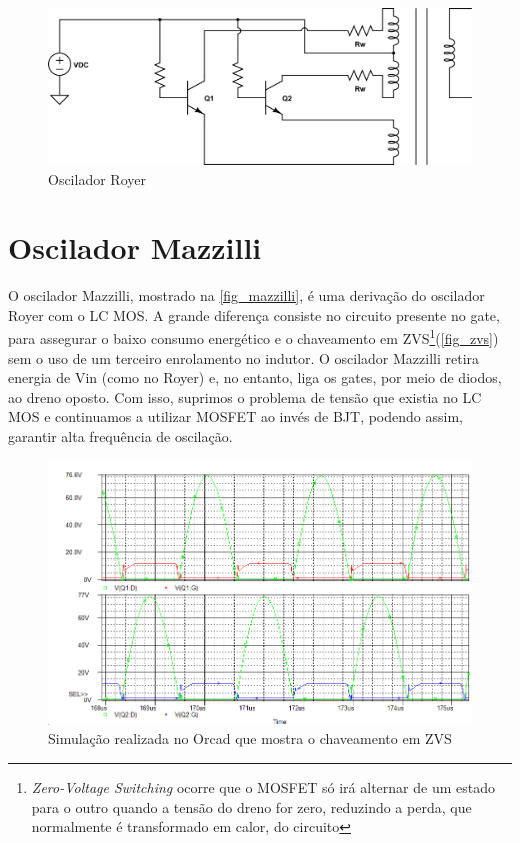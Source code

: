 \begin{figure}[htb]
\caption{\label{fig_royer}Oscilador Royer}
\begin{center}
\includegraphics[scale=0.5]{images/royer-oscillator.png}
\end{center}
\end{figure}

\section{Oscilador Mazzilli}
O oscilador Mazzilli\cite{paolucci2009novel}\cite{mcclusky2010high}, mostrado na \autoref{fig_mazzilli}, é uma derivação do oscilador Royer com o LC MOS. A grande diferença consiste no circuito presente no gate, para assegurar o baixo consumo energético e o chaveamento em ZVS\footnote{\emph{Zero-Voltage Switching} ocorre que o MOSFET só irá alternar de um estado para o outro quando a tensão do dreno for zero, reduzindo a perda, que normalmente é transformado em calor, do circuito}(\autoref{fig_zvs}) sem o uso de um terceiro enrolamento no indutor. O oscilador Mazzilli retira energia de Vin (como no Royer) e, no entanto, liga os gates, por meio de diodos, ao dreno oposto. Com isso, suprimos o problema de tensão que existia no LC MOS e continuamos a utilizar MOSFET ao invés de BJT, podendo assim, garantir alta frequência de oscilação.

\begin{figure}[h]
\caption{\label{fig_zvs}Simulação realizada no Orcad que mostra o chaveamento em ZVS}
\begin{center}
\includegraphics[scale=0.5]{images/zvs.png}
\end{center}
\end{figure}

